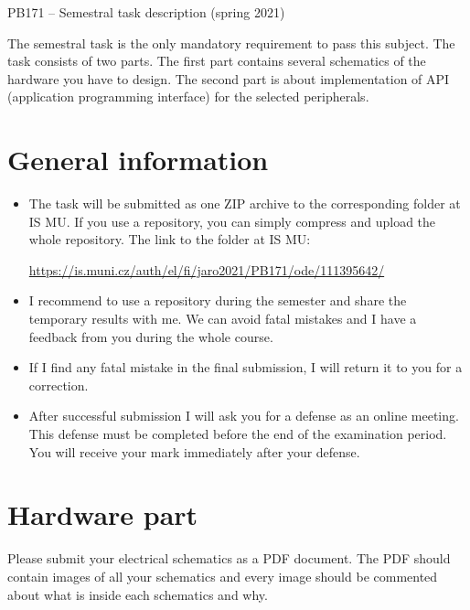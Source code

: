 \documentclass[12pt, a4paper]{article}
\begin{document}
\begin{center}
	\Large PB171 -- Semestral task description (spring 2021)
\end{center}

The semestral task is the only mandatory requirement to pass this subject. The task consists of two parts. The first part contains several schematics of the hardware you have to design. The second part is about implementation of API (application programming interface) for the selected peripherals.

\section{General information}
\begin{itemize}
	\item The task will be submitted as one ZIP archive to the corresponding folder at IS MU. If you use a repository, you can simply compress and upload the whole repository. The link to the folder at IS MU:
	
	\url{https://is.muni.cz/auth/el/fi/jaro2021/PB171/ode/111395642/}
	
	\item I recommend to use a repository during the semester and share the temporary results with me. We can avoid fatal mistakes and I have a feedback from you during the whole course.
	
	\item If I find any fatal mistake in the final submission, I will return it to you for a correction.
	
	\item After successful submission I will ask you for a defense as an online meeting. This defense must be completed before the end of the examination period. You will receive your mark immediately after your defense.
\end{itemize}

\section{Hardware part}
Please submit your electrical schematics as a PDF document. The PDF should contain images of all your schematics and every image should be commented about what is inside each schematics and why.
\end{document}

